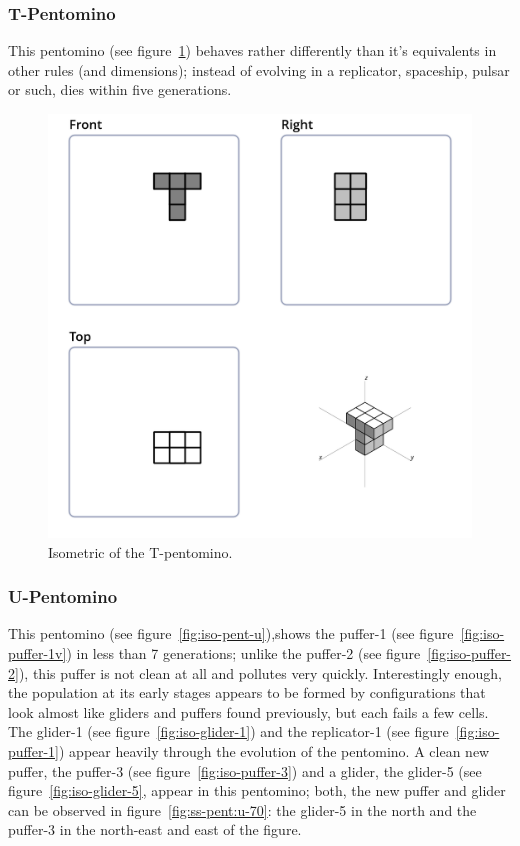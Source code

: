 \subsubsection{T-Pentomino}
\label{sec:t-pentomino}
This pentomino (see figure~\ref{fig:iso-pent-t}) behaves rather differently
than it's equivalents in other rules (and dimensions); instead of evolving in a
replicator, spaceship, pulsar or such, dies within five generations.

\begin{figure}
	\centering
	\includegraphics[scale=0.3]{iso_diagrams/t.png}
	\caption{Isometric of the T-pentomino.}
  \label{fig:iso-pent-t}
\end{figure}

\subsubsection{U-Pentomino}
\label{sec:u-pentomino}
This pentomino (see figure~\ref{fig:iso-pent-u}),shows the puffer-1 (see
figure~\ref{fig:iso-puffer-1v}) in less than 7 generations; unlike the puffer-2
(see figure~\ref{fig:iso-puffer-2}), this puffer is not clean at all and
pollutes very quickly. Interestingly enough, the population at its early stages
appears to be formed by configurations that look almost like gliders and puffers
found previously, but each fails a few cells. The glider-1 (see
figure~\ref{fig:iso-glider-1}) and the replicator-1 (see
figure~\ref{fig:iso-puffer-1}) appear heavily through the evolution of the
pentomino. A clean new puffer, the puffer-3 (see figure~\ref{fig:iso-puffer-3})
and a glider, the glider-5 (see figure~\ref{fig:iso-glider-5}, appear in this
pentomino; both, the new puffer and glider can be observed in
figure~\ref{fig:ss-pent:u-70}: the glider-5 in the north and the puffer-3 in the
north-east and east of the figure.

